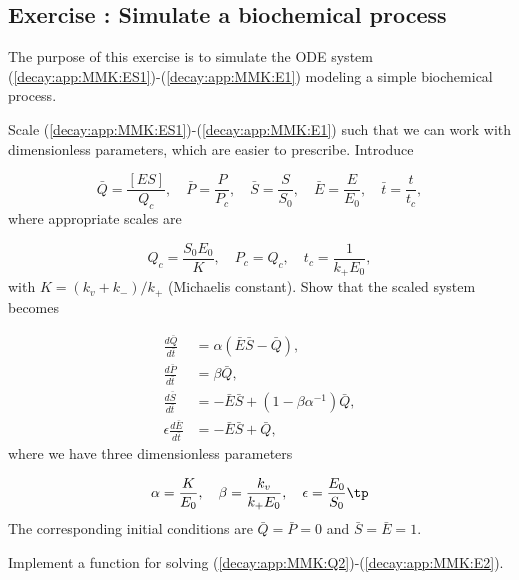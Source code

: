 \documentclass[graybox,sectrefs,envcountresetchap,open=right,final]{svmonodo}
\newenvironment{doconceexercise}{}{}
\newcounter{doconceexercisecounter}
\begin{document}
\begin{doconceexercise}

\subsection*{Exercise \thedoconceexercisecounter: Simulate a biochemical process}

\label{decay:app:exer:MMK}

The purpose of this exercise is to simulate the ODE system
(\ref{decay:app:MMK:ES1})-(\ref{decay:app:MMK:E1}) modeling a simple
biochemical process.


Scale (\ref{decay:app:MMK:ES1})-(\ref{decay:app:MMK:E1}) such that
we can work with dimensionless parameters, which are easier to prescribe.
Introduce

\[ \bar Q = \frac{[ES]}{Q_c},\quad
\bar P = \frac{P}{P_c},\quad \bar S = \frac{S}{S_0},\quad \bar E = \frac{E}{E_0},\quad \bar t = \frac{t}{t_c},\]
where appropriate scales are

\[ Q_c = \frac{S_0E_0}{K},\quad P_c = Q_c, \quad t_c=\frac{1}{k_+E_0},\]
with $K=(k_v+k_-)/k_+$ (Michaelis constant). Show that the scaled
system becomes

\begin{align}
\frac{d\bar Q}{d\bar t} &= \alpha (\bar E\bar S
- \bar Q),
\label{decay:app:MMK:Q2}\\ 
\frac{d\bar P}{d\bar t} &= \beta\bar Q,
\label{decay:app:MMK:P2}\\ 
\frac{d\bar S}{d\bar t} &= -\bar E\bar S
+ (1 - \beta\alpha^{-1})\bar Q,
\label{decay:app:MMK:S2}\\ 
\epsilon\frac{d\bar E}{d\bar t} &= -\bar E\bar S + \bar Q,
\label{decay:app:MMK:E2}
\end{align}
where we have three dimensionless parameters

\[ \alpha = \frac{K}{E_0},\quad \beta = \frac{k_v}{k_+ E_0},\quad
\epsilon = \frac{E_0}{S_0}\tp
\]
The corresponding initial conditions are $\bar Q=\bar P=0$ and
$\bar S=\bar E=1$.



Implement a function for
solving (\ref{decay:app:MMK:Q2})-(\ref{decay:app:MMK:E2}).




\end{doconceexercise}
\end{document}
